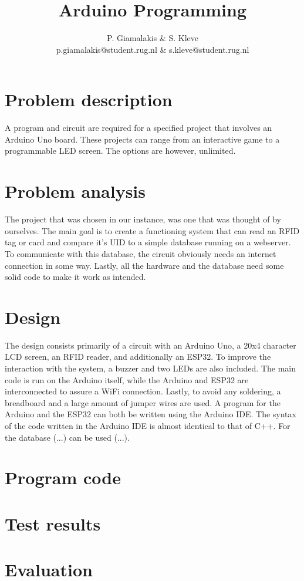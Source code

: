 \documentclass[a4paper,10pt]{article}
\title{Arduino Programming}
\author{P. Giamalakis \& S. Kleve\\
        p.giamalakis@student.rug.nl \& s.kleve@student.rug.nl}
\begin{document}
\maketitle

\section{Problem description}
 A program and circuit are required for a specified project that involves an Arduino Uno board.  These projects can range from an interactive game to a programmable LED screen. The options are however, unlimited.

\section{Problem analysis}
The project that was chosen in our instance, was one that was thought of by ourselves. The main goal is to create a functioning system that can read an RFID tag or card and compare it's UID to a simple database running on a webserver. To communicate with this database, the circuit obviously needs an internet connection in some way. Lastly, all the hardware and the database need some solid code to make it work as intended.

\section{Design}
The design consists primarily of a circuit with an Arduino Uno, a 20x4 character LCD screen, an RFID reader, and additionally an ESP32. To improve the interaction with the system, a buzzer and two LEDs are also included. The main code is run on the Arduino itself, while the Arduino and ESP32 are interconnected to assure a WiFi connection. Lastly, to avoid any soldering, a breadboard and a large amount of jumper wires are used. 
A program for the Arduino and the ESP32 can both be written using the Arduino IDE. The syntax of the code written in the Arduino IDE is almost identical to that of C++. For the database (...) can be used (...). 

\newpage
\section{Program code}
\lstset{style=code}


\newpage


\section{Test results}


\section{Evaluation}
\end{document}
